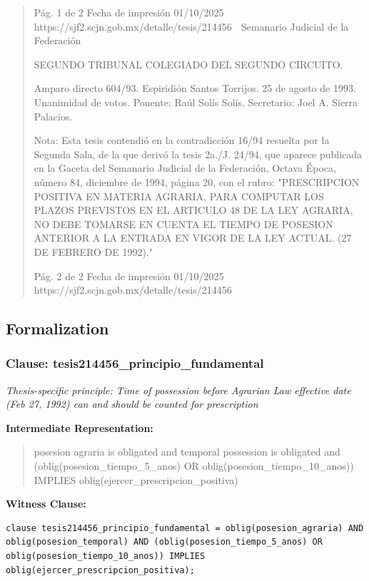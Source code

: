 \documentclass[11pt,a4paper]{article}
\begin{document}
\begin{quote}
                                             Pág. 1 de 2             Fecha de impresión 01/10/2025
  https://sjf2.scjn.gob.mx/detalle/tesis/214456
                                                  Semanario Judicial de la Federación

SEGUNDO TRIBUNAL COLEGIADO DEL SEGUNDO CIRCUITO.


Amparo directo 604/93. Espiridión Santos Torrijos. 25 de agosto de 1993. Unanimidad de votos.
Ponente: Raúl Solís Solís. Secretario: Joel A. Sierra Palacios.

Nota: Esta tesis contendió en la contradicción 16/94 resuelta por la Segunda Sala, de la que derivó
la tesis 2a./J. 24/94, que aparece publicada en la Gaceta del Semanario Judicial de la Federación,
Octava Época, número 84, diciembre de 1994, página 20, con el rubro: "PRESCRIPCION
POSITIVA EN MATERIA AGRARIA, PARA COMPUTAR LOS PLAZOS PREVISTOS EN EL
ARTICULO 48 DE LA LEY AGRARIA, NO DEBE TOMARSE EN CUENTA EL TIEMPO DE
POSESION ANTERIOR A LA ENTRADA EN VIGOR DE LA LEY ACTUAL. (27 DE FEBRERO DE
1992)."




                                             Pág. 2 de 2           Fecha de impresión 01/10/2025
  https://sjf2.scjn.gob.mx/detalle/tesis/214456

\end{quote}

\subsection{Formalization}

\subsubsection{Clause: tesis214456\_principio\_fundamental}

\textit{Thesis-specific principle: Time of possession before Agrarian Law effective date (Feb 27, 1992) can and should be counted for prescription}

\textbf{Intermediate Representation:}

\begin{quote}
posesion agraria is obligated and temporal possession is obligated and (oblig(posesion\_tiempo\_5\_anos) OR oblig(posesion\_tiempo\_10\_anos)) IMPLIES oblig(ejercer\_prescripcion\_positiva)
\end{quote}

\textbf{Witness Clause:}

\begin{lstlisting}[style=witnessstyle, language=Witness]
clause tesis214456_principio_fundamental = oblig(posesion_agraria) AND oblig(posesion_temporal) AND (oblig(posesion_tiempo_5_anos) OR oblig(posesion_tiempo_10_anos)) IMPLIES oblig(ejercer_prescripcion_positiva);
\end{lstlisting}
\end{document}
